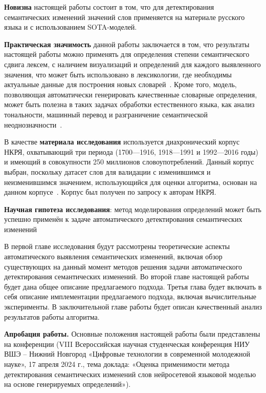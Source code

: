 \documentclass[LI,VKR]{HSEUniversity}
\begin{document}
\textbf{Новизна} настоящей работы состоит в том, что для детектирования семантических изменений
значений слов применяется на материале русского языка и с использованием SOTA-моделей.

\textbf{Практическая значимость} данной работы заключается в том, что результаты настоящей работы
можно применять для определения степени семантического сдвига лексем, с наличием визуализаций и
определений для каждого выявленного значения, что может быть использовано в лексикологии,
где необходимы актуальные данные для построения новых словарей~\cite{DefinitionGenerationMainArticle}.
Кроме того, модель, позволяющая автоматически генерировать качественные словарные определения,
может быть полезна в таких задачах обработки естественного языка, как анализ тональности,
машинный перевод и разграничение семантической неоднозначности~\cite{DefinitionModelingReviewAndDatasetAnalysis}.

В качестве \textbf{материала исследования} используется диахронический корпус НКРЯ, охватывающий
три периода (1700—1916, 1918—1991 и 1992—2016 годы) и имеющий в совокупности 250 миллионов
словоупотреблений.
Данный корпус выбран, поскольку датасет слов для валидации с изменившимся и неизменившимся значением,
использующийся для оценки алгоритма, основан на данном корпусе~\cite{rushifteval}.
Корпус был получен по запросу к авторам НКРЯ.

\textbf{Научная гипотеза исследования}: метод моделирования определений может быть успешно
применён к задаче автоматического детектирования семантических изменений

В первой главе исследования будут рассмотрены теоретические аспекты автоматического выявления
семантических изменений, включая обзор существующих на данный момент методов
решения задачи автоматического детектирования семантических изменений.
Во второй главе настоящей работы будет дана общее описание предлагаемого подхода.
Третья глава будет включать в себя описание имплементации предлагаемого подхода,
включая вычислительные эксперименты.
В заключительной главе работы будет описан качественный анализ результатов работы
алгоритма.

\textbf{Апробация работы.}
Основные положения настоящей работы были представлены на конференции
(VIII Всероссийская научная студенческая конференция НИУ ВШЭ – Нижний Новгород
«Цифровые технологии в современной молодежной науке», 17 апреля 2024 г.,
тема доклада: «Оценка применимости метода детектирования семантических изменений слов нейросетевой
языковой моделью на основе генерируемых определений»).
\end{document}
